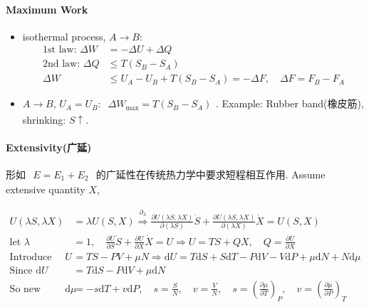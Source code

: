 \documentclass[../../main.tex]{subfiles}
\begin{document}
\paragraph{Maximum Work}
\begin{itemize}
    \item isothermal process, $A\rightarrow B$:
    \begin{align*}
        \text{1st law: }\Delta W &= -\Delta U + \Delta Q\\
        \text{2nd law: }\Delta Q &\leq T(S_{B}-S_{A})\\
        \Delta W &\leq U_{A} - U_{B} + T(S_{B} - S_{A}) = -\Delta F,\quad \Delta F = F_{B} - F_{A}
    \end{align*}
    \item $A\rightarrow B$, $U_{A} = U_{B}$: $\begin{aligned}
        \Delta W_{\text{max}} = T(S_{B}-S_{A})
    \end{aligned}$. Example: Rubber band(橡皮筋), shrinking: $S\uparrow$.
\end{itemize}

\paragraph{Extensivity(广延)}
形如 $\begin{aligned}
    E = E_{1} + E_{2}
\end{aligned}$
的广延性在传统热力学中要求短程相互作用. Assume extensive quantity $X$, 

$\begin{aligned}
    U(\lambda S,\lambda X) &= \lambda U(S,X)\stackrel{\partial_{\lambda}}{\Longrightarrow}\frac{\partial U(\lambda S,\lambda X)}{\partial(\lambda S)}\dot{S} + \frac{\partial U(\lambda S,\lambda X)}{\partial (\lambda X)}\dot{X} = U(S,X) \\
    \text{let }\lambda &= 1,\quad \frac{\partial U}{\partial S}\dot{S} + \frac{\partial U}{\partial X}\dot{X} = U \Rightarrow U = TS + QX, \quad Q = \frac{\partial U}{\partial X}\\
    \text{Introduce physics: }U &= TS-PV+\mu N
    \Rightarrow \mathrm{d}U = T\mathrm{d}S + S\mathrm{d}T - P\mathrm{d}V - V\mathrm{d}P + \mu\mathrm{d}N + N\mathrm{d}\mu\\
    \text{Since }\mathrm{d}U &= T\mathrm{d}S - P\mathrm{d}V + \mu\mathrm{d}N\\
    \text{So new physics: }\mathrm{d}\mu &= -s\mathrm{d}T + v\mathrm{d}P,\quad s = \frac{S}{N},\quad v = \frac{V}{N},\quad s = \left(\frac{\partial \mu}{\partial T}\right)_{P},\quad v = \left(\frac{\partial \mu}{\partial P}\right)_{T}
\end{aligned}$
\end{document}
